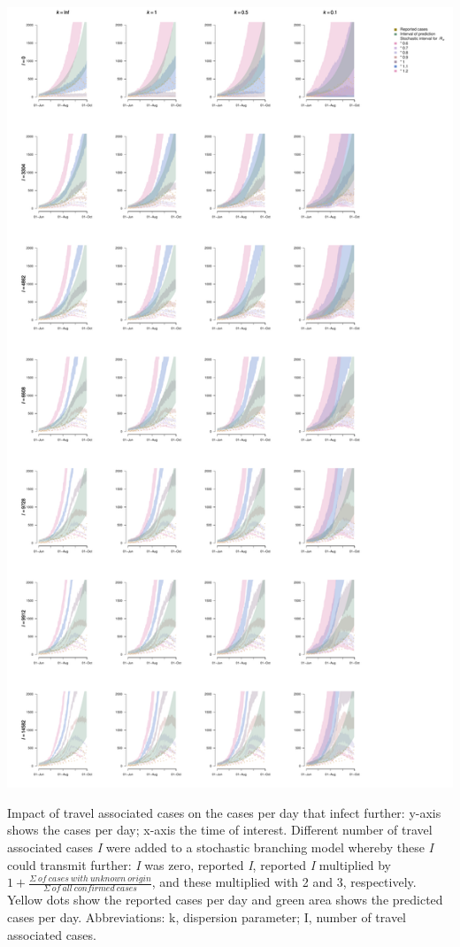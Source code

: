\documentclass[10pt, a4paper, twoside]{article}
\begin{document}
\begin{suppfigure}[h]
\centering
\includegraphics[scale=0.3]{sim_cases_d_imports_infect_2021-02-24.pdf}
\caption{Impact of travel associated cases on the cases per day that infect further: y-axis shows the cases per day; x-axis the time of interest. Different number of travel associated cases \emph{I} were added to a stochastic branching model whereby these \emph{I} could transmit further: \emph{I} was zero, reported \emph{I}, reported \emph{I} multiplied by $1+ \frac{\Sigma ~of ~cases ~with ~unknown ~origin }{\Sigma ~of ~all ~confirmed ~cases}$, and these multiplied with 2 and 3, respectively. Yellow dots show the reported cases per day and green area shows the predicted cases per day. Abbreviations: k, dispersion parameter; I, number of travel associated cases.}
\end{suppfigure}
\end{document}
